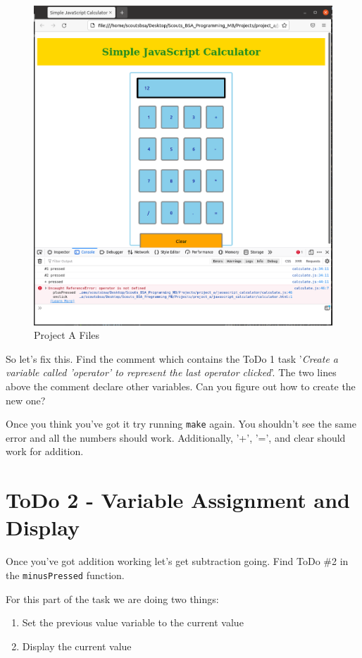     \begin{figure}[ht]
      \centering
      \includegraphics[width=0.8\linewidth]{project_a_todo_1_browser.png}
      \caption{Project A Files}
      \label{fig:project_a_todo_1_browser}
    \end{figure}
    \FloatBarrier

    So let's fix this.
    Find the comment which contains the ToDo 1 task '\textit{Create a variable called 'operator' to represent the last operator clicked}'.
    The two lines above the comment declare other variables.
    Can you figure out how to create the new one?

    Once you think you've got it try running \texttt{make} again.
    You shouldn't see the same error and all the numbers should work.
    Additionally, '+', '=', and clear should work for addition.

  \section{ToDo 2 - Variable Assignment and Display}
  \label{sec:project_a_todo_2}
  
    Once you've got addition working let's get subtraction going.
    Find ToDo \#2 in the \texttt{minusPressed} function.

    For this part of the task we are doing two things:
    
    \begin{enumerate}
      \item Set the previous value variable to the current value
      \item Display the current value
    \end{enumerate}

